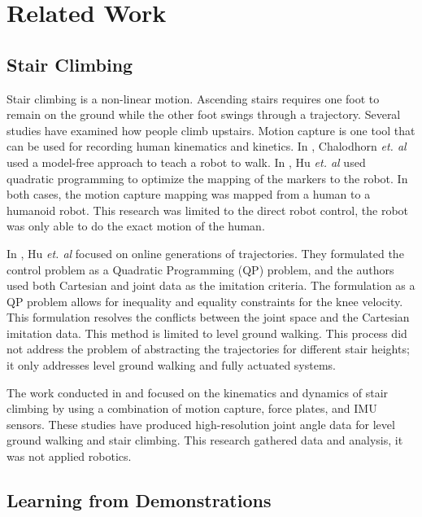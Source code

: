 \section{Related Work}


\subsection{Stair Climbing}

Stair climbing is a non-linear motion. Ascending stairs requires one foot to remain on the ground while the other foot swings through a trajectory\cite{hicks2012temporal}. Several studies have examined how people climb upstairs. Motion capture is one tool that can be used for recording human kinematics and kinetics. In  \cite{chalodhorn2007learning}, Chalodhorn \textit{et. al} used a model-free approach to teach a robot to walk. In  \cite{hu2014online}, Hu \textit{et. al} used quadratic programming to optimize the mapping of the markers to the robot. In both cases, the motion capture mapping was mapped from a human to a humanoid robot. This research was limited to the direct robot control, the robot was only able to do the exact motion of the human.

 In \cite{taskjointmocap}, Hu \textit{et. al} focused on online generations of trajectories. They formulated the control problem as a Quadratic Programming (QP) problem, and the authors used both Cartesian and joint data as the imitation criteria. The formulation as a QP problem allows for inequality and equality constraints for the knee velocity. This formulation resolves the conflicts between the joint space and the Cartesian imitation data. This method is limited to level ground walking. This process did not address the problem of abstracting the trajectories for different stair heights; it only addresses level ground walking and fully actuated systems.
 
 The work conducted in \cite{andriacchi1980study} and \cite{hicks2011lower} focused on the kinematics and dynamics of stair climbing by using a combination of motion capture, force plates, and IMU sensors. These studies have produced high-resolution joint angle data for level ground walking and stair climbing. This research gathered data and analysis, it was not applied robotics.

\subsection{Learning from Demonstrations}

